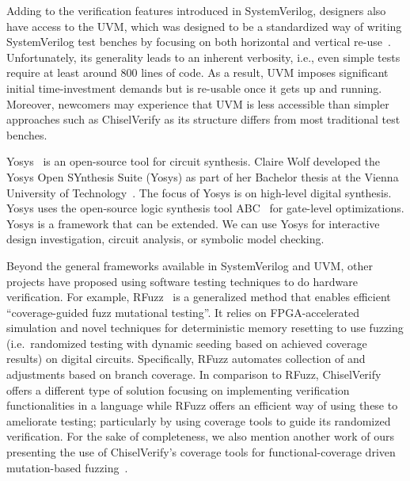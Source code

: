 \documentclass[conference]{IEEEtran}
\begin{document}
Adding to the verification features introduced in SystemVerilog, designers also have 
access to the UVM, which was designed to be a 
standardized way of writing SystemVerilog test benches by focusing on both horizontal and 
vertical re-use~\cite{uvm2015}. Unfortunately, its generality leads to an inherent 
verbosity, i.e., even simple tests require at least around 800 lines of code. As a result, 
UVM imposes significant initial time-investment demands but is re-usable once it gets up and 
running. Moreover, newcomers may experience that UVM is less accessible than simpler approaches 
such as ChiselVerify as its structure differs from most traditional test benches.

Yosys~\cite{Yosys} is an open-source tool for circuit synthesis.
Claire Wolf developed the Yosys Open SYnthesis Suite (Yosys) as part of her
Bachelor thesis at the Vienna University of Technology~\cite{yosys:bachelor}.
The focus of Yosys is on high-level digital synthesis.
Yosys uses the open-source logic synthesis tool ABC~\cite{abc:cav:2010} for gate-level optimizations.
Yosys is a framework that can be extended.
We can use Yosys for interactive design investigation, circuit analysis, or symbolic model checking.

Beyond the general frameworks available in SystemVerilog and UVM, other projects have proposed 
using software testing techniques to do hardware verification. For example, RFuzz~\cite{rfuzz2018} 
is a generalized method that enables efficient ``coverage-guided fuzz mutational testing''. 
It relies on FPGA-accelerated simulation and novel techniques for deterministic memory 
resetting to use fuzzing (i.e.\ randomized testing with dynamic seeding based on achieved 
coverage results) on digital circuits. Specifically, RFuzz automates collection of and adjustments 
based on branch coverage. In comparison to RFuzz, ChiselVerify offers a different type 
of solution focusing on implementing verification functionalities in a language while 
RFuzz offers an efficient way of using these to ameliorate testing; particularly by using coverage 
tools to guide its randomized verification. For the sake of completeness, we also mention another 
work of ours presenting the use of ChiselVerify's coverage tools for functional-coverage driven mutation-based
fuzzing~\cite{verify:fuzzing:2021}.
\end{document}
